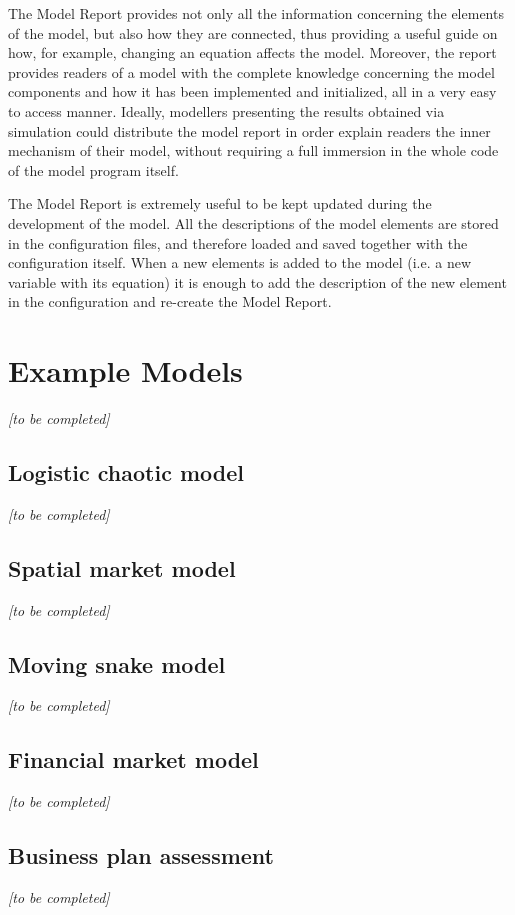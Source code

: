 \documentclass [11pt,a4paper] {book}
\begin{document}
The Model Report provides not only all the information concerning the elements of the
model, but also how they are connected, thus providing a useful guide on how, for
example, changing an equation affects the model. Moreover, the report provides readers of
a model with the complete knowledge concerning the model components and how it has been
implemented and initialized, all in a very easy to access manner. Ideally, modellers
presenting the results obtained via simulation could distribute the model report in order
explain readers the inner mechanism of their model, without requiring a full immersion in
the whole code of the model program itself.

The Model Report is extremely useful to be kept updated during the development of the
model. All the descriptions of the model elements are stored in the configuration files,
and therefore loaded and saved together with the configuration itself. When a new
elements is added to the model (i.e. a new variable with its equation) it is enough to
add the description of the new element in the configuration and re-create the Model
Report.

\section{Example Models}\label{sec:ex}
\textit{[to be completed]}

\subsection{Logistic chaotic model}
\textit{[to be completed]}

\subsection{Spatial market model}
\textit{[to be completed]}

\subsection{Moving snake model}
\textit{[to be completed]}

\subsection{Financial market model}
\textit{[to be completed]}

\subsection{Business plan assessment}
\textit{[to be completed]}
\end{document}
